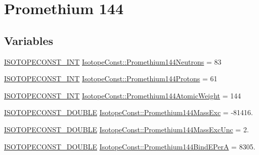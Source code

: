 \hypertarget{group___isotope_const-_promethium-_pm144}{}\section{Promethium 144}
\label{group___isotope_const-_promethium-_pm144}
\subsection*{Variables}
\begin{DoxyCompactItemize}
\item 
\mbox{\hyperlink{group___isotope_const-_macros_ga5f18360b3e99483a35c32d789e62621c}{I\+S\+O\+T\+O\+P\+E\+C\+O\+N\+S\+T\+\_\+\+I\+NT}} \mbox{\hyperlink{group___isotope_const-_promethium-_pm144_ga35e6ddb1902bdebc2b6229f1ab41de13}{Isotope\+Const\+::\+Promethium144\+Neutrons}} = 83
\item 
\mbox{\hyperlink{group___isotope_const-_macros_ga5f18360b3e99483a35c32d789e62621c}{I\+S\+O\+T\+O\+P\+E\+C\+O\+N\+S\+T\+\_\+\+I\+NT}} \mbox{\hyperlink{group___isotope_const-_promethium-_pm144_gaf39f6b301b31b4c514e0093d0c682f56}{Isotope\+Const\+::\+Promethium144\+Protons}} = 61
\item 
\mbox{\hyperlink{group___isotope_const-_macros_ga5f18360b3e99483a35c32d789e62621c}{I\+S\+O\+T\+O\+P\+E\+C\+O\+N\+S\+T\+\_\+\+I\+NT}} \mbox{\hyperlink{group___isotope_const-_promethium-_pm144_ga8b0d187d174b688a097590e0e37cdec3}{Isotope\+Const\+::\+Promethium144\+Atomic\+Weight}} = 144
\item 
\mbox{\hyperlink{group___isotope_const-_macros_ga8f45a7272ce02c0b4c65c44636ed719a}{I\+S\+O\+T\+O\+P\+E\+C\+O\+N\+S\+T\+\_\+\+D\+O\+U\+B\+LE}} \mbox{\hyperlink{group___isotope_const-_promethium-_pm144_ga2cebec7b4c83851b861e544c96803d2f}{Isotope\+Const\+::\+Promethium144\+Mass\+Exc}} = -\/81416.
\item 
\mbox{\hyperlink{group___isotope_const-_macros_ga8f45a7272ce02c0b4c65c44636ed719a}{I\+S\+O\+T\+O\+P\+E\+C\+O\+N\+S\+T\+\_\+\+D\+O\+U\+B\+LE}} \mbox{\hyperlink{group___isotope_const-_promethium-_pm144_ga1dbe30c7e50f0593bbcc2c9fde750716}{Isotope\+Const\+::\+Promethium144\+Mass\+Exc\+Unc}} = 2.
\item 
\mbox{\hyperlink{group___isotope_const-_macros_ga8f45a7272ce02c0b4c65c44636ed719a}{I\+S\+O\+T\+O\+P\+E\+C\+O\+N\+S\+T\+\_\+\+D\+O\+U\+B\+LE}} \mbox{\hyperlink{group___isotope_const-_promethium-_pm144_gae2d44000581dfb2faa46f2dcd6f4dc42}{Isotope\+Const\+::\+Promethium144\+Bind\+E\+PerA}} = 8305.

\end{DoxyCompactItemize}
